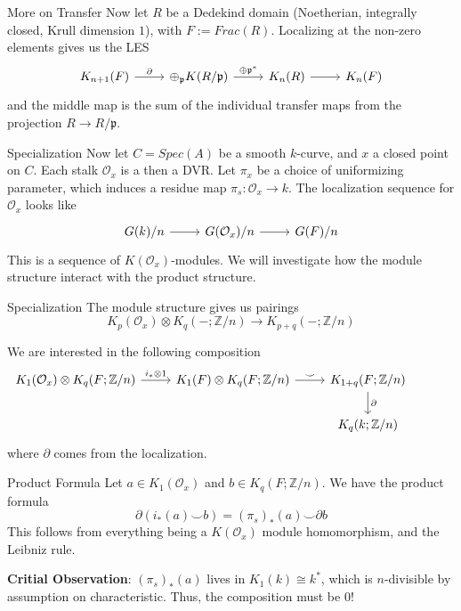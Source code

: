 \documentclass{beamer}
\begin{document}
\begin{frame}[fragile]{More on Transfer}
  Now let $R$ be a Dedekind domain (Noetherian, integrally closed, Krull dimension $1$), with $F:=Frac(R)$. Localizing at the non-zero elements gives us the LES 
\[\begin{tikzcd}
	{K_{n+1}(F)} & {\oplus_{\mathfrak{p}}K(R/\mathfrak{p})} & {K_n(R)} & {K_n(F)}
	\arrow["\partial", from=1-1, to=1-2]
	\arrow["{\oplus\mathfrak{p^*}}", from=1-2, to=1-3]
	\arrow[from=1-3, to=1-4]
\end{tikzcd}\]
and the middle map is the sum of the individual transfer maps from the projection $R\to R/\mathfrak{p}$.

\end{frame}

\begin{frame}[fragile]{Specialization}
Now let $C=Spec(A)$ be a smooth $k$-curve, and $x$ a closed point on $C$. Each stalk $\mathcal{O}_x$ is a then a DVR. Let $\pi_x$ be a choice of uniformizing parameter, which induces a residue map $\pi_s: \mathcal{O}_x\to k $. The localization sequence for $\mathcal{O}_x$ looks like 
\[\begin{tikzcd}
	{G(k)/n} & {G(\mathcal{O}_x)/n} & {G(F)/n}
	\arrow[from=1-1, to=1-2]
	\arrow[from=1-2, to=1-3]
\end{tikzcd}\]
\pause
This is a sequence of $K(\mathcal{O}_x)$-modules. We will investigate how the module structure interact with the product structure. 

\end{frame}

\begin{frame}[fragile]{Specialization}
The module structure gives us pairings
\[K_p(\mathcal{O}_x)\otimes K_q(-; \mathbb{Z}/n)\to K_{p+q}(-; \mathbb{Z}/n)\]

\pause
We are interested in the following composition 
\[\begin{tikzcd}
	{K_1(\mathcal{O}_x)\otimes K_q(F;\mathbb{Z}/n)} & {K_1(F)\otimes K_q(F;\mathbb{Z}/n)} & { K_{1+q}(F;\mathbb{Z}/n)} & {} \\
	&& {K_q(k; \mathbb{Z}/n)}
	\arrow["{i_*\otimes 1}", from=1-1, to=1-2]
	\arrow["\smile", from=1-2, to=1-3]
	\arrow["\partial", from=1-3, to=2-3]
\end{tikzcd}\]
where $\partial$ comes from the localization.
\end{frame}



\begin{frame}{Product Formula}
  Let $a\in K_1(\mathcal{O}_x)$ and $b\in K_q(F; \mathbb{Z}/n)$. We have the product formula 
  \[\partial(i_*(a)\smile b)=(\pi_s)_*(a)\smile \partial b\]
  This follows from everything being a $K(\mathcal{O}_x)$ module homomorphism, and the Leibniz rule. \vfill

\textbf{Critial Observation}: $(\pi_s)_*(a)$ lives in $K_1(k)\cong k^*$, which is $n$-divisible by assumption on characteristic. Thus, the composition must be $0$!






\end{frame}
\end{document}
